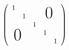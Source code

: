 \documentclass{article}
\begin{document}
\[ \left(\begin{array}{ccccc}
1                                         \\
  & 1 &  & \parbox[b][0pt][b]{0pt}{\Huge0}\\
  &  & 1                                  \\
\parbox[b][0pt][c]{0pt}{\Huge0} & & & 1   \\
 & & & & 1\end{array}\right) \]
\end{document}
